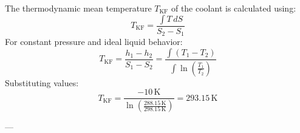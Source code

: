 The thermodynamic mean temperature \( T_{\text{KF}} \) of the coolant is calculated using:  
\[
T_{\text{KF}} = \frac{\int T \, dS}{S_2 - S_1}
\]  
For constant pressure and ideal liquid behavior:  
\[
T_{\text{KF}} = \frac{h_1 - h_2}{S_1 - S_2} = \frac{\int \left( T_1 - T_2 \right)}{\int \ln \left( \frac{T_1}{T_2} \right)}
\]  
Substituting values:  
\[
T_{\text{KF}} = \frac{-10 \, \text{K}}{\ln \left( \frac{288.15 \, \text{K}}{298.15 \, \text{K}} \right)} = 293.15 \, \text{K}
\]  

---
